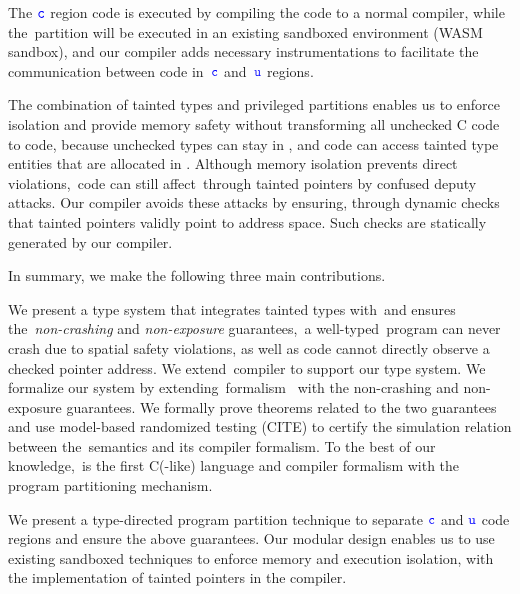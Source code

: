 The $\textcolor{blue}{\texttt{c}}$ region code is executed by compiling the code to a normal \checkedc compiler, while the~\ucregion partition will be executed in an existing sandboxed environment (\eg WASM sandbox), and our compiler adds necessary instrumentations to facilitate the communication between code in~$\textcolor{blue}{\texttt{c}}$ and~$\textcolor{blue}{\texttt{u}}$ regions.

The combination of tainted types and privileged partitions 
enables us to enforce isolation and provide memory safety without transforming all unchecked C code to \checkedc code,
because unchecked types can stay in \ucregion, and \cregion code can access tainted type entities that are allocated 
in \ucregion.
% 
Although memory isolation prevents direct violations,~\ucregion code can still affect~\cregion through tainted pointers by confused deputy attacks.
Our compiler avoids these attacks by ensuring, through dynamic checks that tainted pointers validly point to \ucregion address space.
Such checks are statically generated by our compiler.

In summary, we make the following three main contributions.

We present a type system that integrates tainted types with~\checkedc and ensures the~\emph{non-crashing} and \emph{non-exposure} guarantees,~\ie a well-typed~\systemname program can never crash due to spatial safety violations,
as well as \ucregion code cannot directly observe a checked pointer address.
We extend~\checkedc compiler to support our type system.
We formalize our system by extending~\checkedc formalism~\citet{li22checkedc} with the non-crashing and non-exposure guarantees.
We formally prove theorems related to the two guarantees and use model-based randomized testing (CITE) to certify the simulation relation between the~\systemname semantics and its compiler formalism.
To the best of our knowledge,~\systemname is the first C(-like) language and compiler formalism with the program partitioning mechanism.

We present a type-directed program partition technique to separate $\textcolor{blue}{\texttt{c}}$ and $\textcolor{blue}{\texttt{u}}$ code regions and ensure the above guarantees.
Our modular design enables us to use existing sandboxed techniques to enforce memory and execution isolation, with the implementation of tainted pointers in the \systemname compiler.

